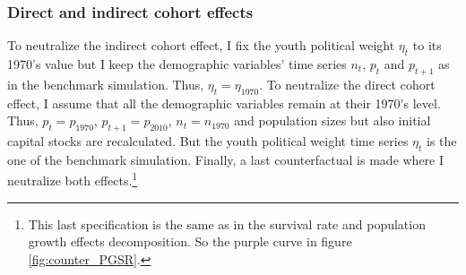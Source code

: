 \subsubsection{Direct and indirect cohort effects}

To neutralize the indirect cohort effect, I fix the youth political weight $\eta_t$ to its 1970's value but I keep the demographic variables' time series $n_t$, $p_t$ and $p_{t+1}$ as in the benchmark simulation. Thus, $\eta_t = \eta_{1970}$. To neutralize the direct cohort effect, I assume that all the demographic variables remain at their 1970's level. Thus, $p_t = p_{1970}$, $p_{t+1} = p_{2010}$, $n_t = n_{1970}$ and population sizes but also initial capital stocks are recalculated. But the youth political weight time series $\eta_t$ is the one of the benchmark simulation. Finally, a last counterfactual is made where I neutralize both effects.\footnote{This last specification is the same as in the survival rate and population growth effects decomposition. So the purple curve in figure \ref{fig:counter_PGSR}.}

